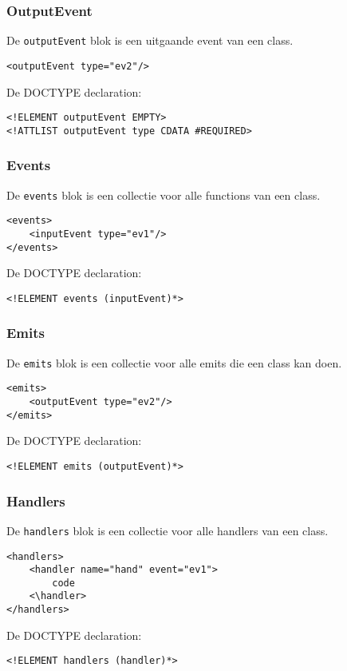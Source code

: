 \documentclass[]{article}
\begin{document}
\subsubsection{OutputEvent}
De \texttt{outputEvent} blok is een uitgaande event van een class.
\lstset{language=XML}
\begin{lstlisting}
<outputEvent type="ev2"/>
\end{lstlisting}
De DOCTYPE declaration: 
\lstset{language=XML}
\begin{lstlisting}
<!ELEMENT outputEvent EMPTY>
<!ATTLIST outputEvent type CDATA #REQUIRED>
\end{lstlisting}

\subsubsection{Events}
De \texttt{events} blok is een collectie voor alle functions van een class.
\lstset{language=XML}
\begin{lstlisting}
<events>
	<inputEvent type="ev1"/>
</events>
\end{lstlisting}
De DOCTYPE declaration: 
\lstset{language=XML}
\begin{lstlisting}
<!ELEMENT events (inputEvent)*>
\end{lstlisting}

\subsubsection{Emits}
De \texttt{emits} blok is een collectie voor alle emits die een class kan doen.
\lstset{language=XML}
\begin{lstlisting}
<emits>
	<outputEvent type="ev2"/>
</emits>
\end{lstlisting}
De DOCTYPE declaration: 
\lstset{language=XML}
\begin{lstlisting}
<!ELEMENT emits (outputEvent)*>
\end{lstlisting}

\subsubsection{Handlers}
De \texttt{handlers} blok is een collectie voor alle handlers van een class.
\lstset{language=XML}
\begin{lstlisting}
<handlers>
	<handler name="hand" event="ev1">
		code
	<\handler>
</handlers>
\end{lstlisting}
De DOCTYPE declaration: 
\lstset{language=XML}
\begin{lstlisting}
<!ELEMENT handlers (handler)*>
\end{lstlisting}
\end{document}
